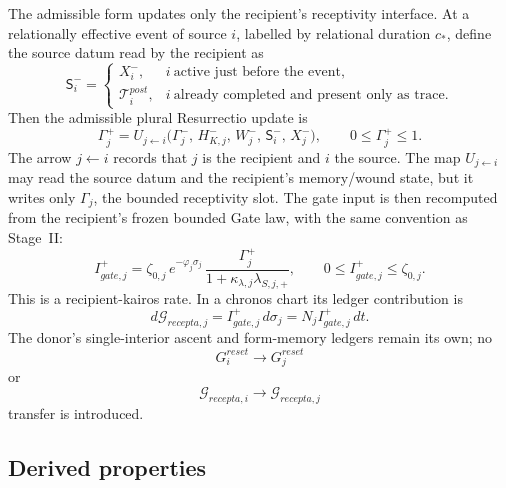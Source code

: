 \documentclass[11pt,a4paper]{article}
\def\mathfrak#1{#1}%
\def\mathrm#1{#1}%
\theoremstyle{definition}
\theoremstyle{plain}
\theoremstyle{remark}
\begin{document}
The admissible form updates only the recipient's receptivity interface. At a
relationally effective event of source \(i\), labelled by relational duration
\(\mathfrak c_*\), define the source datum read by the recipient as
\[
\mathsf S_i^-
=
\begin{cases}
X_i^-, & i\ \text{active just before the event},\\[0.25em]
\mathcal T_i^{\mathrm{post}}, & i\ \text{already completed and present only as trace}.
\end{cases}
\]
Then the admissible plural Resurrectio update is
\[
\boxed{\;
\Gamma_j^{+}
=
\mathfrak U_{j\leftarrow i}
\bigl(
\Gamma_j^{-},\,H_{K,j}^{-},\,W_j^{-},\,\mathsf S_i^{-},\,X_j^{-}
\bigr),
\qquad
0\le\Gamma_j^{+}\le1.
\;}
\]
The arrow \(j\leftarrow i\) records that \(j\) is the recipient and \(i\) the
source. The map \(\mathfrak U_{j\leftarrow i}\) may read the source datum and the
recipient's memory/wound state, but it writes only \(\Gamma_j\), the bounded
receptivity slot.
The gate input is then recomputed from the recipient's frozen bounded Gate law,
with the same convention as Stage~II:
\[
I_{\mathrm{gate},j}^{+}
=
\zeta_{0,j}\,e^{-\varphi_j\sigma_j}\,
\frac{
\Gamma_j^{+}
}{
1+\kappa_{\lambda,j}\lambda_{S,j,+}
},
\qquad
0\le I_{\mathrm{gate},j}^{+}\le \zeta_{0,j}.
\]
This is a recipient-kairos rate. In a chronos chart its ledger contribution is
\[
d\mathcal G_{\mathrm{recepta},j}
=
I_{\mathrm{gate},j}^{+}\,d\sigma_j
=
N_j I_{\mathrm{gate},j}^{+}\,dt.
\]
The donor's single-interior ascent and form-memory ledgers remain its own; no
\[
G_i^{\mathrm{reset}}\to G_j^{\mathrm{reset}}
\]
or
\[
\mathcal G_{\mathrm{recepta},i}\to \mathcal G_{\mathrm{recepta},j}
\]
transfer is introduced.

\subsection{Derived properties}
\end{document}
